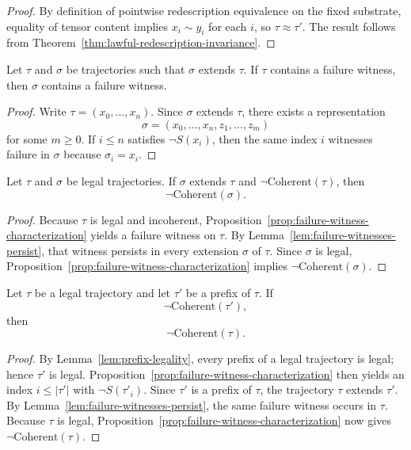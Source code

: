 \begin{proof}
By definition of pointwise redescription equivalence on the fixed substrate, equality of tensor content implies $x_i\sim y_i$ for each $i$, so $\tau \approx \tau'$. The result follows from Theorem~\ref{thm:lawful-redescription-invariance}.\cite{MaleyTrajectory}
\end{proof}

\begin{lemma}
\label{lem:failure-witnesses-persist}
Let $\tau$ and $\sigma$ be trajectories such that $\sigma$ extends $\tau$. If $\tau$ contains a failure witness, then $\sigma$ contains a failure witness.
\end{lemma}

\begin{proof}
Write $\tau=(x_0,\dots,x_n)$. Since $\sigma$ extends $\tau$, there exists a representation
\[
\sigma=(x_0,\dots,x_n,z_1,\dots,z_m)
\]
for some $m\ge 0$. If $i\le n$ satisfies $\neg S(x_i)$, then the same index $i$ witnesses failure in $\sigma$ because $\sigma_i=x_i$.\cite{MaleyTrajectory}
\end{proof}

\begin{theorem}
\label{thm:irrecoverability-of-coherence-failure}
Let $\tau$ and $\sigma$ be legal trajectories. If $\sigma$ extends $\tau$ and $\neg\mathrm{Coherent}(\tau)$, then
\[
\neg\mathrm{Coherent}(\sigma).
\]
\end{theorem}

\begin{proof}
Because $\tau$ is legal and incoherent, Proposition~\ref{prop:failure-witness-characterization} yields a failure witness on $\tau$. By Lemma~\ref{lem:failure-witnesses-persist}, that witness persists in every extension $\sigma$ of $\tau$. Since $\sigma$ is legal, Proposition~\ref{prop:failure-witness-characterization} implies $\neg\mathrm{Coherent}(\sigma)$.\cite{MaleyTrajectory}
\end{proof}

\begin{theorem}
\label{thm:no-deferred-coherence}
Let $\tau$ be a legal trajectory and let $\tau'$ be a prefix of $\tau$. If
\[
\neg\mathrm{Coherent}(\tau'),
\]
then
\[
\neg\mathrm{Coherent}(\tau).
\]
\end{theorem}

\begin{proof}
By Lemma~\ref{lem:prefix-legality}, every prefix of a legal trajectory is legal; hence $\tau'$ is legal. Proposition~\ref{prop:failure-witness-characterization} then yields an index $i\le |\tau'|$ with $\neg S(\tau'_i)$. Since $\tau'$ is a prefix of $\tau$, the trajectory $\tau$ extends $\tau'$. By Lemma~\ref{lem:failure-witnesses-persist}, the same failure witness occurs in $\tau$. Because $\tau$ is legal, Proposition~\ref{prop:failure-witness-characterization} now gives $\neg\mathrm{Coherent}(\tau)$.\cite{MaleyTrajectory}
\end{proof}

